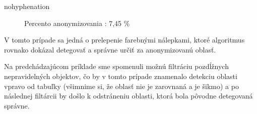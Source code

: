 \begin{hyphenrules}{nohyphenation}
\begin{figure}[H]
\begin{minipage}[t]{.5\linewidth}
\caption{Percento anonymizovania : 7,45 \%}
\label{fig:5.3} 
\end{minipage}\hfill
\begin{minipage}[b]{.5\linewidth}
\end{minipage}
\end{figure}

V tomto prípade sa jedná o prelepenie farebnými nálepkami, ktoré algoritmus rovnako dokázal detegovať a správne určiť za anonymizovanú oblasť. 
\newline

Na predchádzajúcom príklade sme spomenuli možnú filtráciu pozdĺžnych nepravidelných objektov, čo by v tomto prípade znamenalo detekciu oblasti vpravo od tabuľky (všimnime si, že oblasť nie je zarovnaná a je šikmo) a po následnej filtárcii by došlo k odstráneniu oblasti, ktorá bola pôvodne detegovaná správne. 
\newline


\end{hyphenrules}
